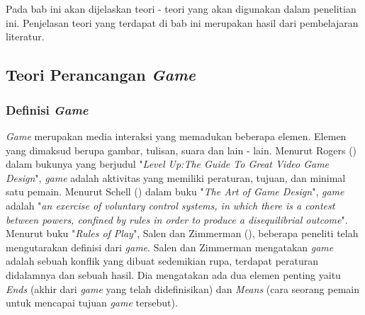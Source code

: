 \chapter{\babDua}
Pada bab ini akan dijelaskan teori - teori yang akan digunakan dalam penelitian ini. Penjelasan teori yang terdapat di bab ini merupakan hasil dari pembelajaran literatur.
\section{Teori Perancangan \textit{Game}}
	\subsection{Definisi \textit{Game}}
	\textit{Game} merupakan media interaksi yang memadukan beberapa elemen. Elemen yang dimaksud berupa gambar, tulisan, suara dan lain - lain. Menurut Rogers (\citeyear{book.lvlup}) dalam bukunya yang berjudul "\textit{Level Up:The Guide To Great Video Game Design}", \textit{game} adalah aktivitas yang memiliki peraturan, tujuan, dan minimal satu pemain. Menurut Schell (\citeyear{book.artgamedesign}) dalam buku "\textit{The Art of \textit{Game} Design}", \textit{game} adalah "\textit{an exercise of voluntary control systems, in which there is a contest between powers, confined by rules in order to produce a disequilibrial outcome}".
	\linebreak\linebreak
	Menurut buku "\textit{Rules of Play}", Salen dan Zimmerman (\citeyear{book.ruleofplay}), beberapa peneliti telah mengutarakan definisi dari \textit{game}. Salen dan Zimmerman mengatakan \textit{game} adalah sebuah konflik yang dibuat sedemikian rupa, terdapat peraturan didalamnya dan sebuah hasil. Dia mengatakan ada dua elemen penting yaitu \textit{Ends} (akhir dari  \textit{game} yang telah didefinisikan) dan \textit{Means} (cara seorang pemain untuk mencapai tujuan \textit{game} tersebut).

